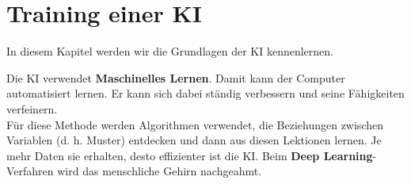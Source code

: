 \chapter{Training einer KI}
\label{chap:training}

In diesem Kapitel werden wir die Grundlagen der KI kennenlernen.

\bigskip

Die KI verwendet \textbf{Maschinelles Lernen}. Damit kann der Computer automatisiert lernen. Er kann sich dabei ständig verbessern und seine Fähigkeiten verfeinern.\\
Für diese Methode werden Algorithmen verwendet, die Beziehungen zwischen Variablen (d. h. Muster) entdecken und dann aus diesen Lektionen lernen. Je mehr Daten sie erhalten, desto effizienter ist die KI.
Beim \textbf{Deep Learning}-Verfahren wird das menschliche Gehirn nachgeahmt.